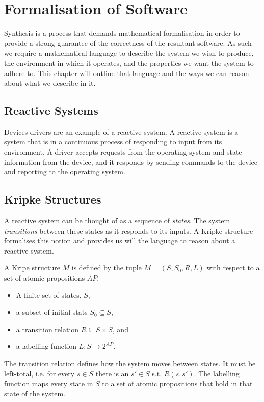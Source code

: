 \chapter{Formalisation of Software}

Synthesis is a process that demands mathematical formalisation in order to
provide a strong guarantee of the correctness of the resultant software. As
such we require a mathematical language to describe the system we wish to
produce, the environment in which it operates, and the properties we want the
system to adhere to. This chapter will outline that language and the ways we
can reason about what we describe in it.

\section{Reactive Systems}

Devices drivers are an example of a reactive system. A reactive system is a
system that is in a continuous process of responding to input from its
environment. A driver accepts requests from the operating system and state
information from the device, and it responds by sending commands to the device
and reporting to the operating system.

\section{Kripke Structures}

A reactive system can be thought of as a sequence of \emph{states}. The system
\emph{transitions} between these states as it responds to its inputs. A Kripke
structure~\cite{Kripke63} formalises this notion and provides us will the
language to reason about a reactive system.

A Kripe structure $M$ is defined by the tuple $M = (S, S_0, R, L)$ with respect
to a set of atomic propositions $AP$.

\begin{itemize}
    \item A finite set of states, $S$,
    \item a subset of initial stats $S_0 \subseteq S$,
    \item a transition relation $R \subseteq S \times S$, and
    \item a labelling function $L : S \to 2^{AP}$.
\end{itemize}

The transition relation defines how the system moves between states. It must be
left-total, i.e. for every $s \in S$ there is an $s' \in S$ s.t. $R(s, s')$.
The labelling function maps every state in $S$ to a set of atomic propositions
that hold in that state of the system.


